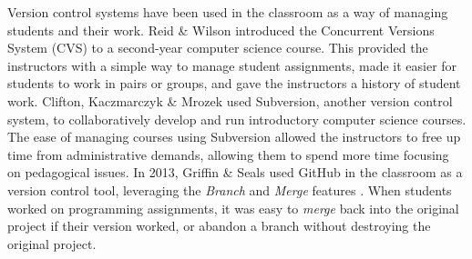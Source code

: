 


Version control systems have been used in the classroom as a way of managing students and their work. Reid \& Wilson \cite{Reid:2005:LDI:1047124.1047441} introduced the Concurrent Versions System (CVS) to a second-year computer science course. This provided the instructors with a simple way to manage student assignments, made it easier for students to work in pairs or groups, and gave the instructors a history of student work. Clifton, Kaczmarczyk \& Mrozek \cite{Clifton:2007:SFS:1227504.1227344} used Subversion, another version control system, to collaboratively develop and run introductory computer science courses. The ease of managing courses using Subversion allowed the instructors to free up time from administrative demands, allowing them to spend more time focusing on pedagogical issues. In 2013, Griffin \& Seals used GitHub in the classroom as a version control tool, leveraging the \textit{Branch} and \textit{Merge} features \cite{Griffin:2013:GCJ:2458539.2458551}. When students worked on programming assignments, it was easy to \textit{merge} back into the original project if their version worked, or abandon a branch without destroying the original project.

